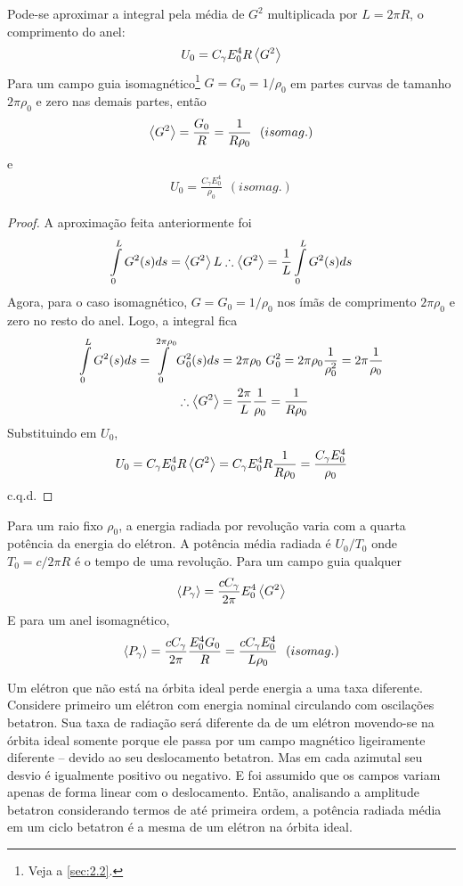 Pode-se aproximar a integral pela média de $G^2$ multiplicada por $L=2\pi R$, o comprimento do anel:
\begin{align}
	U_0 = C_\gamma E_0^4 R \left< G^2 \right>
\end{align}
Para um campo guia isomagnético\footnote{Veja a \autoref{sec:2.2}.} $G = G_0=1/\rho_0$ em partes curvas de tamanho $2\pi\rho_0$ e zero nas demais partes, então
\begin{align}
	\left< G^2 \right> = \frac{G_0}{R} = \frac{1}{R \rho_0}\ \ (isomag.)
\end{align}
e
\begin{align}
	U_0 = \frac{C_\gamma E_0^4}{\rho_0}\ \ (isomag.)
\end{align}
\begin{proof}
	A aproximação feita anteriormente foi
	\begin{align*}
		\int\limits_{0}^{L}G^2(s)ds = \left< G^2 \right>L \therefore \left< G^2 \right> = \frac{1}{L}\int\limits_{0}^{L}G^2(s)ds
	\end{align*}
	Agora, para o caso isomagnético, $G=G_0=1/\rho_0$ nos ímãs de comprimento $2\pi \rho_0$ e zero no resto do anel. Logo, a integral fica
	\begin{align*}
		\int\limits_{0}^{L}G^2(s)ds = \int\limits_{0}^{2\pi\rho_0}G_0^2(s)ds &= 2\pi\rho_0\ G_0^2 = 2\pi\rho_0 \frac{1}{\rho_0^2} = 2\pi \frac{1}{\rho_0}\\
		\therefore \left< G^2 \right> &= \frac{2\pi}{L} \frac{1}{\rho_0} = \frac{1}{R \rho_0}
	\end{align*}
	Substituindo em $U_0$,
	\begin{align*}
		U_0 = C_\gamma E_0^4 R \left< G^2 \right> = C_\gamma E_0^4 R \frac{1}{R \rho_0} = \frac{C_\gamma E_0^4}{\rho_0}
	\end{align*}
	c.q.d.
\end{proof}

Para um raio fixo $\rho_0$, a energia radiada por revolução varia com a quarta potência da energia do elétron. A potência média radiada é $U_0/T_0$ onde $T_0 = c/2\pi R$ é o tempo de uma revolução. Para um campo guia qualquer
\begin{align}
	\left< P_\gamma \right> = \frac{c C_\gamma}{2\pi} E_0^4 \left< G^2 \right>
\end{align} 
E para um anel isomagnético,
\begin{align}
	\left< P_\gamma \right> = \frac{c C_\gamma}{2\pi}\frac{E_0^4 G_0}{R} = \frac{c C_\gamma E_0^4}{L \rho_0}\ \ (isomag.)\label{eq:4.10}
\end{align}

Um elétron que não está na órbita ideal perde energia a uma taxa diferente. Considere primeiro um elétron com energia nominal circulando com oscilações betatron. Sua taxa de radiação será diferente da de um elétron movendo-se na órbita ideal somente porque ele passa por um campo magnético ligeiramente diferente -- devido ao seu deslocamento betatron. Mas em cada azimutal seu desvio é igualmente positivo ou negativo. E foi assumido que os campos variam apenas de forma linear com o deslocamento. Então, analisando a amplitude betatron considerando termos de até primeira ordem, a potência radiada média em um ciclo betatron é a mesma de um elétron na órbita ideal.

